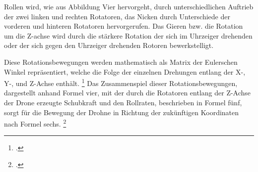 Rollen wird, wie aus Abbildung Vier hervorgeht, durch unterschiedlichen Auftrieb der zwei linken und rechten Rotatoren, das Nicken durch Unterschiede der vorderen und hinteren Rotatoren hervorgerufen.
Das Gieren bzw. die Rotation um die Z-achse wird durch die stärkere Rotation der sich im Uhrzeiger drehenden oder der sich gegen den Uhrzeiger drehenden Rotoren bewerkstelligt. 

Diese Rotationsbewegungen werden mathematisch als Matrix der Eulerschen Winkel repräsentiert, welche die Folge der einzelnen Drehungen entlang der X-, Y-, und Z-Achse enthält. \footcite[Vgl.][S. 3]{Deshpande.2020}
Das Zusammenspiel dieser Rotationsbewegungen, dargestellt anhand Formel vier, mit der durch die Rotatoren entlang der Z-Achse der Drone erzeugte Schubkraft und den Rollraten, beschrieben in Formel fünf, sorgt für die Bewegung der Drohne in Richtung der zukünftigen Koordinaten nach Formel sechs. \footcite[Vgl.][S. 2]{Deshpande.2021}

